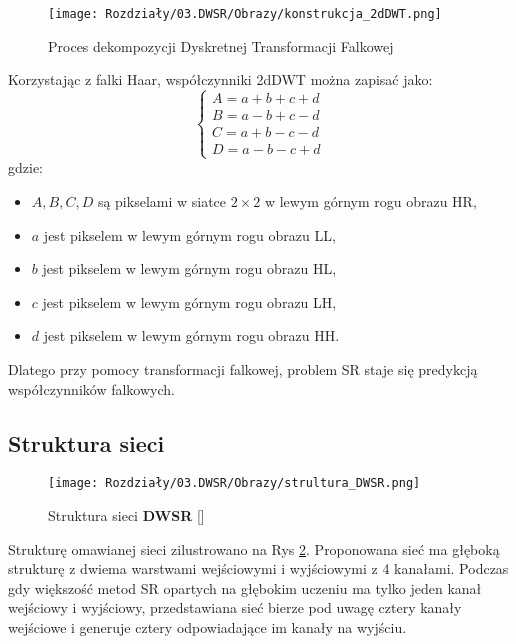 \begin{figure}[ht]
    \centering
    \begin{minipage}[t]{0.7\linewidth}
        \texttt{[image: Rozdziały/03.DWSR/Obrazy/konstrukcja\_2dDWT.png]}  
        \caption{Proces dekompozycji Dyskretnej Transformacji Falkowej}
        \label{fig:image48}
    \end{minipage}
\end{figure}


Korzystając z falki Haar, współczynniki 2dDWT można zapisać jako:
\begin{equation}
    \left\{\begin{array}{l}
    A=a+b+c+d \\
    B=a-b+c-d \\
    C=a+b-c-d \\
    D=a-b-c+d
    \end{array}\right.
\end{equation}
gdzie: 
\begin{itemize}
    \item $A, B, C, D$ są pikselami w siatce $2 \times  2$ w lewym górnym rogu obrazu HR,
    \item $a$ jest pikselem w lewym górnym rogu obrazu LL,
    \item $b$ jest pikselem w lewym górnym rogu obrazu HL,
    \item $c$ jest pikselem w lewym górnym rogu obrazu LH,
    \item $d$ jest pikselem w lewym górnym rogu obrazu HH.
\end{itemize}

Dlatego przy pomocy transformacji falkowej, problem SR staje się predykcją współczynników falkowych.


\newpage
\subsection*{Struktura sieci}

\begin{figure}[ht]
    \centering
    \begin{minipage}[t]{0.9\linewidth}
        \texttt{[image: Rozdziały/03.DWSR/Obrazy/strultura\_DWSR.png]}  
        \caption{Struktura sieci \textbf{DWSR} [\cite{guo2017deep}]}
        \label{fig:image49}
    \end{minipage}
\end{figure}

Strukturę omawianej sieci \cite{guo2017deep} zilustrowano na Rys \ref{fig:image49}. Proponowana sieć ma głęboką strukturę z dwiema warstwami wejściowymi i wyjściowymi z 4 kanałami. Podczas gdy większość metod SR opartych na głębokim uczeniu ma tylko jeden kanał wejściowy i wyjściowy, przedstawiana sieć bierze pod uwagę cztery kanały wejściowe i generuje cztery odpowiadające im kanały na wyjściu. 

